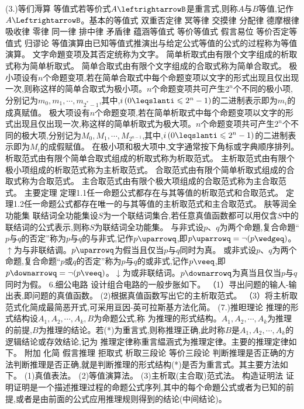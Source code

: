 {(3.)等们溽算}
等值式若等价式$A\leftrightarrowB$是重言式,则称$A$与$B$等值,记作$A\LeftrightarrowB$。基本的等值式
双重否定律
冥等律
交摸律
分配律
德摩根律
吸收律
零律
同一律
排中律
矛盾律
蕴涵等值式
等价等值式
假言易位
等价否定等值式
归谬论
等值演算由已知等值式推演出与给定公式等值的公式的过程称为等值演算。
文字命題变项及其否定统称为文字。
简单析取式由有限个文字组成的析取式称为简单析取式。
简单合取式由有限个文字组成的合取式称为简单合取式。
极小项设有$n$个命题变项,若在简单合取式中每个命题变项以文字的形式出现且仅出现一次,则称这样的简单合取式为极小项。$n$个命题变项共可产生$2^{n}$个不同的极小项,分别记为$m_{0},m_{1},\cdots,m_{2^{*}-1}$,其中,$i\left(0\leqslanti\leqslant2^{n}-1\right)$的二进制表示即为$m_{i}$的成真赋值。
极大项设有$n$个命题变项,若在简单析取式中每个命题变项以文字的形式出现且仅出现一次,称这样的简单析取式为极大项。$n$个命题变项共可产生$2^{n}$个不同的极大项,分别记为$M_{0},M_{1},\cdots,M_{2^{n-1}}$,其中,$i\left(0\leqslanti\leqslant2^{n}-1\right)$的二进制表示即为$M_{i}$的成假赋值。
在极小项和极大项中,文字通常按下角标或字典顺序排列。
析取范式由有限个简单合取式组成的析取式称为析取范式。
主析取范式由有限个极小项组成的析取范式称为主析取范式。
合取范式由有限个简单析取式组成的合取式称为合取范式。
主合取范式由有限个极大项组成的合取范式称为主合取范式。
{主要定理}
定理1.1任一命题公式都存在与其等值的析取范式和合取范式。
定理1.2任一命题公式都存在唯一的与其等值的主析取范式和主合取范式。
肤等润全功能集
联结词全功能集设$S$为一个联结词集合,若任意真值函数都可以用仅含$S$中的联结词的公式表示,则称$S$为联结词全功能集。
与非式设$p、q$为两个命題,复合命題“$p$与$q$的否定”称为$p$与$q$的与非式,记作$p\uparrowq$,即$p\uparrowq=\neg(p\wedgeq)$。$\uparrow$为与非联结调。$p\uparrowq$为假当且仅当$p$与$q$同时为真。
或非式设$p、q$为两个命题,复合命题“$p$或$q$的否定”称为$p$与$q$的或非式,记作$p\veeq$,即$p\downarrowq=\neg(p\veeq)$。$\downarrow$为或非联结词。$p\downarrowq$为真当且仅当$p$与$q$同时为假。
{6.细公电路}
设计组合电路的一般步胀如下。
（1）寻出问题的输人-输出表,即问题的真值函数。
(2)根据真值函数写出它的主析取范式。
（3）将主析取范式化简成最简恶开式,可采用亘因-英可拉斯基方法化简。
(7.)推㫜理论
推理的形式结构设$A_{1},A_{2},\cdots,A_{k},B$为命题公式,称
为推理的形式结构。$A_{1},A_{2},\cdots,A_{k}$为推理的前提,$B$为推理的结论。若(*)为重言式,则称推理正确,此时称$B$是$A_{1},A_{2},\cdots,A_{k}$的逻辑结论或存效结论,记为
推理定律称重言緼涵式为推理定律。主要的推理定律如下。
附加
化简
假言推理
拒取式
析取三段论
等价三段论
判断推理是否正确的方法判断推理是否正确,就是判断推理的形式结构(*)是否为重言式。其主要方法如下。
(1)真值表法。
(2)等值演算法。
(3)主析取(主合取)范式法。
构造证明法
证明证明是一个描述推理过程的命题公式序列,其中的每个命題公式或者为已知的前提,或者是由前面的公式应用推理规则得到的结论(中间结论)。
